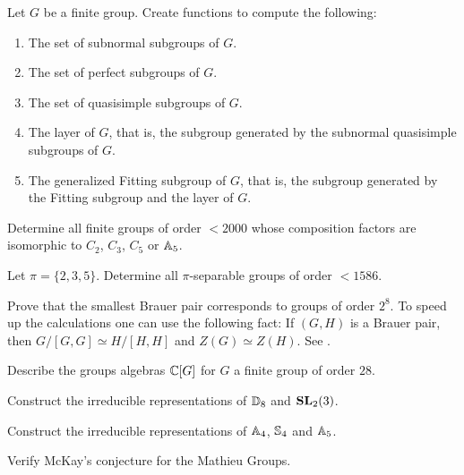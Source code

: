 \begin{prob}
Let $G$ be a finite group.
Create functions to compute the following:
\begin{enumerate}[label=(\alph*)]
    \item The set of subnormal subgroups of $G$.
    \item The set of perfect subgroups of $G$.
    \item The set of quasisimple subgroups of $G$.
    \item The layer of $G$, that is, the subgroup generated by the subnormal quasisimple subgroups of $G$.
    \item The generalized Fitting subgroup of $G$, that is, the subgroup generated by the Fitting subgroup and the layer of $G$.
\end{enumerate}
\end{prob}

\begin{prob}
    Determine all finite groups of order $<2000$ whose composition factors are isomorphic to $C_2$, $C_3$, $C_5$ or $\mathbb{A}_5$.
\end{prob}

\begin{prob}
    Let $\pi = \{2,3,5\}$.
    Determine all $\pi$-separable groups of order $<1586$.
\end{prob}

\begin{prob}
    Prove that the smallest Brauer pair 
    corresponds to groups of order $2^8$. To speed up the calculations
    one can use the following fact: If $(G,H)$ is a Brauer pair, then
    $G/[G,G]\simeq H/[H,H]$ and $Z(G)\simeq Z(H)$. 
    See \cite[Lemma 2.6.3]{MR2680716}. 
\end{prob}

\begin{prob}
	\label{prob:groupalgebra}
	Describe the groups algebras $\mathbb{C}[G]$ for $G$ a
	finite group of order $28$.
\end{prob}

\begin{prob}
	Construct the irreducible representations of $\mathbb{D}_8$ and $\mathbf{SL}_2(3)$.
\end{prob}

\begin{prob}
	Construct the irreducible representations of 
	$\mathbb{A}_4$, $\mathbb{S}_4$ and $\mathbb{A}_5$.
\end{prob}

\begin{prob}
	\label{prob:McKay:M11}
	Verify McKay's conjecture for the Mathieu Groups.
\end{prob}


